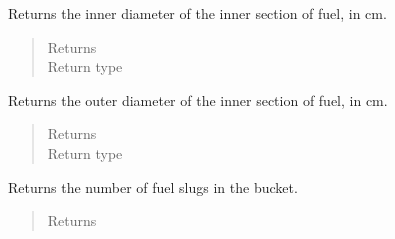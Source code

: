 \documentclass[letterpaper,10pt,openany,oneside,english]{sphinxmanual}
\begin{document}
\begin{fulllineitems}

\begin{fulllineitems}
\label{\detokenize{support_rst/fuel_bucket:fuel_bucket.FuelBucket.get_inner_slug_id}}
Returns the inner diameter of the inner section of fuel, in cm.
\begin{quote}\begin{description}
\item[{Returns}] \leavevmode
{}

\item[{Return type}] \leavevmode
{}

\end{description}\end{quote}

\end{fulllineitems}


\begin{fulllineitems}
\label{\detokenize{support_rst/fuel_bucket:fuel_bucket.FuelBucket.get_inner_slug_od}}
Returns the outer  diameter of the inner section of fuel, in cm.
\begin{quote}\begin{description}
\item[{Returns}] \leavevmode
{}

\item[{Return type}] \leavevmode
{}

\end{description}\end{quote}

\end{fulllineitems}


\begin{fulllineitems}
\label{\detokenize{support_rst/fuel_bucket:fuel_bucket.FuelBucket.get_n_slugs}}
Returns the number of fuel slugs in the bucket.
\begin{quote}\begin{description}
\item[{Returns}] \leavevmode
{}


\end{description}
\end{quote}
\end{fulllineitems}
\end{fulllineitems}
\end{document}
